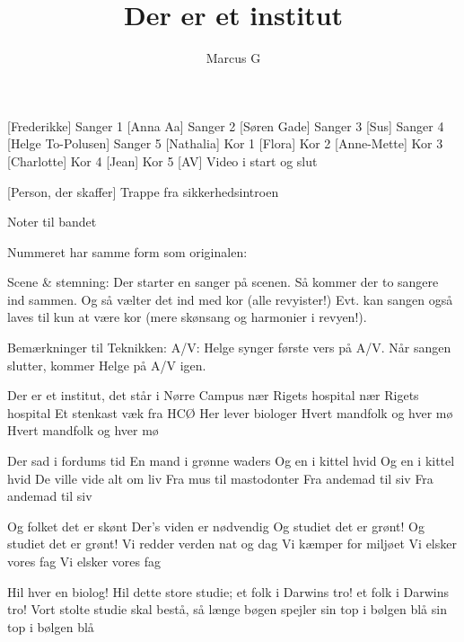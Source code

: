 \documentclass[a4paper,11pt]{article}
\title{Der er et institut}
\author{Marcus G}
\begin{document}
\maketitle

\begin{roles}
    [Frederikke] Sanger 1
    [Anna Aa] Sanger 2
    [Søren Gade] Sanger 3
[Sus] Sanger 4
[Helge To-Polusen] Sanger 5
    [Nathalia] Kor 1
    [Flora] Kor 2
    [Anne-Mette] Kor 3
[Charlotte] Kor 4
[Jean] Kor 5
[AV] Video i start og slut
\end{roles}

\begin{props}
    [Person, der skaffer] Trappe fra sikkerhedsintroen
\end{props}

\scene

Noter til bandet

Nummeret har samme form som originalen:

Scene \& stemning:
Der starter en sanger på scenen. Så kommer der to sangere ind sammen. Og så vælter det ind med kor (alle revyister!)
Evt. kan sangen også laves til kun at være kor (mere skønsang og harmonier i revyen!).

Bemærkninger til Teknikken:
A/V: Helge synger første vers på A/V. Når sangen slutter, kommer Helge
på A/V igen.


\begin{song}
Der er et institut,
det står i Nørre Campus
nær Rigets hospital
nær Rigets hospital
Et stenkast væk fra HCØ
Her lever biologer
Hvert mandfolk og hver mø
Hvert mandfolk og hver mø

Der sad i fordums tid
En mand i grønne waders
Og en i kittel hvid
Og en i kittel hvid
De ville vide alt om liv
Fra mus til mastodonter
Fra andemad til siv
Fra andemad til siv

Og folket det er skønt
Der's viden er nødvendig
Og studiet det er grønt!
Og studiet det er grønt!
Vi redder verden nat og dag
Vi kæmper for miljøet
Vi elsker vores fag
Vi elsker vores fag

Hil hver en biolog!
Hil dette store studie;
et folk i Darwins tro!
et folk i Darwins tro!
Vort stolte studie skal bestå,
så længe bøgen spejler
sin top i bølgen blå
sin top i bølgen blå

\end{song}
\end{document}
